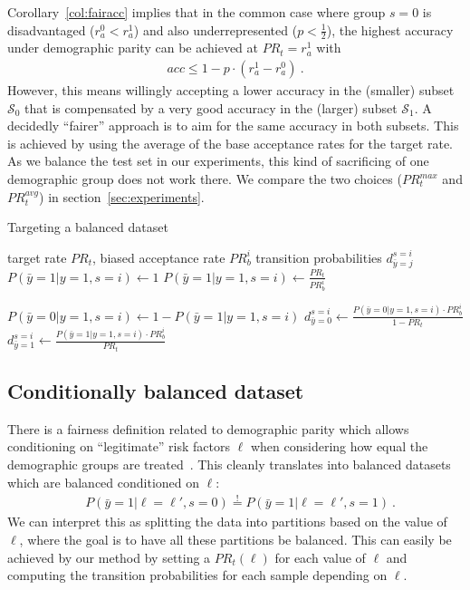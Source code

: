 Corollary~\ref{col:fairacc} implies that
in the common case where group $s=0$ is disadvantaged ($r_a^0 < r_a^1$) and also underrepresented ($p<\tfrac{1}{2}$),
the highest accuracy under demographic parity can be achieved at $\mathit{PR}_t=r_a^1$ with
\begin{align}
  \mathit{acc} \leq 1 - p\cdot\left( r^1_a -r^0_a \right)~.
\end{align}
However, this means willingly accepting a lower accuracy in the (smaller) subset $\mathcal{S}_0$
that is compensated by a very good accuracy in the (larger) subset $\mathcal{S}_1$.
A decidedly ``fairer'' approach is to aim for the same accuracy in both subsets.
This is achieved by using the average of the base acceptance rates for the target rate.
As we balance the test set in our experiments, this kind of sacrificing of one demographic group does not work there.
We compare the two choices ($\mathit{PR}_t^{max}$ and $\mathit{PR}_t^{avg}$) in section~\ref{sec:experiments}.

\begin{algorithm}[t]
  \caption{Targeting a balanced dataset}%
  \label{alg:parity}
  \begin{algorithmic}[1]
    \REQUIRE target rate $\mathit{PR}_t$,  biased acceptance rate $\mathit{PR}_b^i$
    \ENSURE transition probabilities $d^{s=i}_{\bar{y}=j}$
    \STATE $P(\bar{y}=1|y=1,s=i) \gets 1$
    \ELSE
    \STATE $P(\bar{y}=1|y=1,s=i) \gets \frac{\mathit{PR}_t}{\mathit{PR}_b^i}$
    \ENDIF

    \STATE $P(\bar{y}=0|y=1,s=i) \gets 1 - P(\bar{y}=1|y=1,s=i)$
    \STATE $d^{s=i}_{\bar{y}=0} \gets \frac{P(\bar{y}=0|y=1,s=i)\cdot \mathit{PR}_b^i}{1 - \mathit{PR}_t}$
    \STATE $d^{s=i}_{\bar{y}=1} \gets \frac{P(\bar{y}=1|y=1,s=i)\cdot \mathit{PR}_b^i}{\mathit{PR}_t}$
    \ENDIF
  \end{algorithmic}
\end{algorithm}

\subsection{Conditionally balanced dataset}
There is a fairness definition related to demographic parity which allows conditioning on ``legitimate'' risk factors $\ell$
when considering how equal the demographic groups are treated~\citep{corbett2017algorithmic}.
This cleanly translates into balanced datasets which are balanced conditioned on $\ell$:
\begin{align}
  &P(\bar{y}=1|\ell=\ell\prime, s=0) \overset{!}{=} P(\bar{y}=1|\ell=\ell\prime, s=1)~.
\end{align}
We can interpret this as splitting the data into partitions based on the value of $\ell$,
where the goal is to have all these partitions be balanced.
This can easily be achieved by our method by setting a $\mathit{PR}_t(\ell)$ for each value of $\ell$
and computing the transition probabilities for each sample depending on $\ell$.

